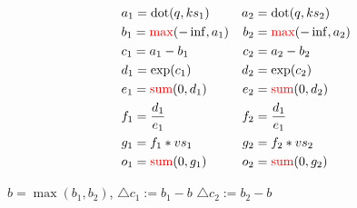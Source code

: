 \begin{align*}
  &a_1 = \text{dot}(q, ks_1) &a_2 &= \text{dot}(q, ks_2) \\
  &b_1 = \textcolor{red}{\max}(-\inf, a_1) &b_2 &= \textcolor{red}{\max}(-\inf, a_2) \\
  &c_1 = a_1 - b_1 &c_2&= a_2 - b_2 \\
  &d_1 = \exp(c_1) &d_2&=\exp(c_2) \\
  &e_1 = \textcolor{red}{\text{sum}}(0, d_1)&e_2&=\textcolor{red}{\text{sum}}(0,d_2) \\
  &f_1 = \frac{d_1}{e_1}&f_2&=\frac{d_1}{e_1} \\
  &g_1 = f_1 *vs_1 &g_2&=f_2 * vs_2 \\
  &o_1 = \textcolor{red}{\text{sum}}(0, g_1) &o_2 &= \textcolor{red}{\text{sum}}(0, g_2) \\
\end{align*}

$b = \max(b_1, b_2)$, $\triangle c_1 := b_1 - b$ $\triangle c_2 := b_2 - b$

